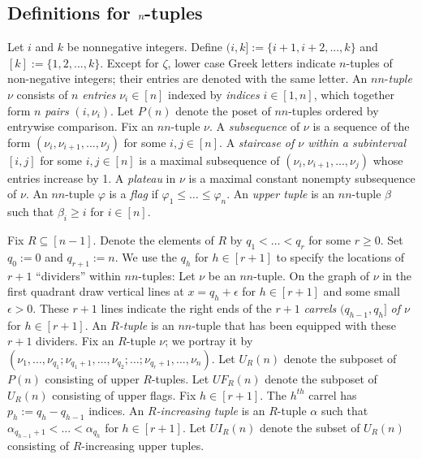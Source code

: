 \documentclass[11pt]{article}
\theoremstyle{definition}
\theoremstyle{remark}
\numberwithin{equation}{section}
\begin{document}
\begin{spacing}{1.35}
\section{Definitions for $\mathbf{\emph{n}}$-tuples}

Let $i$ and $k$ be nonnegative integers.  Define $(i, k] := \{i+1, i+2, ... , k\}$ and $[k] := \{1, 2, ... , k \}$.  Except for $\zeta$, lower case Greek letters indicate $n$-tuples of non-negative integers; their entries are denoted with the same letter.  An $nn$-\textit{tuple} $\nu$ consists of $n$ \emph{entries} $\nu_i \in [n]$ indexed by \emph{indices} $i \in [1,n]$, which together form $n$ \emph{pairs} $(i, \nu_i)$.  Let $P(n)$ denote the poset of $nn$-tuples ordered by entrywise comparison.  Fix an $nn$-tuple $\nu$.  A \emph{subsequence} of $\nu$ is a sequence of the form $(\nu_i, \nu_{i+1}, ... , \nu_j)$ for some $i, j \in [n]$.  A \emph{staircase of $\nu$ within a subinterval $[i,j]$} for some $i, j \in [n]$ is a maximal subsequence of $(\nu_i, \nu_{i+1}, ... , \nu_j)$ whose entries increase by 1.  A \emph{plateau} in $\nu$ is a maximal constant nonempty subsequence of $\nu$.  An $nn$-tuple $\varphi$ is a \textit{flag} if $\varphi_1 \leq \ldots \leq \varphi_n$.  An \emph{upper tuple} is an $nn$-tuple $\beta$ such that $\beta_i \geq i$ for $i \in [n]$.




Fix $R \subseteq [n-1]$.  Denote the elements of $R$ by $q_1 < \ldots < q_r$ for some $r \geq 0$.  Set $q_0 := 0$ and $q_{r+1} := n$.  We use the $q_h$ for $h \in [r+1]$ to specify the locations of $r+1$ ``dividers'' within $nn$-tuples:  Let $\nu$ be an $nn$-tuple.  On the graph of $\nu$ in the first quadrant draw vertical lines at $x = q_h + \epsilon$ for $h \in [r+1]$ and some small $\epsilon > 0$.  These $r+1$ lines indicate the right ends of the $r+1$ \emph{carrels} $(q_{h-1}, q_h]$ \emph{of $\nu$} for $h \in [r+1]$.  An \emph{$R$-tuple} is an $nn$-tuple that has been equipped with these $r+1$ dividers.  Fix an $R$-tuple $\nu$;  we portray it by $(\nu_1, ... , \nu_{q_1} ; \nu_{q_1+1}, ... , \nu_{q_2}; ... ; \nu_{q_r+1}, ... , \nu_n)$.  Let $U_R(n)$ denote the subposet of $P(n)$ consisting of upper $R$-tuples.  Let $UF_R(n)$ denote the subposet of $U_R(n)$ consisting of upper flags.  Fix $h \in [r+1]$.  The $h^{th}$ carrel has $p_h := q_h - q_{h-1}$ indices.  An \emph{$R$-increasing tuple} is an $R$-tuple $\alpha$ such that  $\alpha_{q_{h-1}+1} < ... < \alpha_{q_h}$ for $h \in [r+1]$.  Let $UI_R(n)$ denote the subset of $U_R(n)$ consisting of $R$-increasing upper tuples.




\end{spacing}
\end{document}
